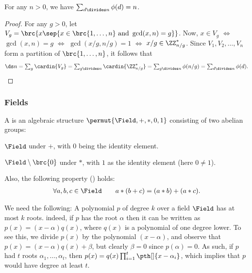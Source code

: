 \begin{lemma}
    For any $n > 0$, we have $\sum_{d \divides n} \phi(d) =n$.
\end{lemma}
\begin{proof}
    For any $g > 0$, let $V_g = \brc{ x \sep{ x \in \brc{1, \ldots, n}
          \text{ and } \gcd(x, n) = g}}$. Now, $x \in V_g$ $\iff$
    $\gcd(x,n) = g$ $\iff$ $\gcd(x/g, n/g) = 1$ $\iff$ $x/g \in
    \ZZ_{n/g}^*$. Since $V_1, V_2, \ldots, V_n$ form a partition of
    $\brc{1,\ldots, n}$, it follows that
    \begin{math}
        \ds \Biggl. n%
        =%
        \sum_g \cardin{V_g}%
        =%
        \sum_{g \divides n} \cardin{\ZZ_{n/g}^*}%
        =%
        \sum_{g \divides n} \phi(n/g)%
        =%
        \sum_{d \divides n} \phi(d).
    \end{math}
\end{proof}




\subsubsection{Fields}

\begin{defn}
    A  is an algebraic structure $\permut{\Field, +, *,
       0, 1}$ consisting of two abelian groups:
    \begin{compactenumA}
        \item $\Field$ under $+$, with $0$ being the identity element.
        
        \item $\Field \setminus \brc{0}$ under $*$, with $1$ as the
        identity element (here $0 \neq 1$).
    \end{compactenumA}
    Also, the following property () holds:
    \begin{align*}
        \forall a,b,c \in \Field \qquad a * (b + c) = (a*b) + (a*c).
    \end{align*}
\end{defn}

We need the following: A polynomial $p$ of degree $k$ over a field
$\Field$ has at most $k$ roots. indeed, if $p$ has the root $\alpha$
then it can be written as $p(x) = (x-\alpha) q(x)$, where $q(x)$ is a
polynomial of one degree lower. To see this, we divide $p(x)$ by the
polynomial $(x-\alpha)$, and observe that $p(x) = (x-\alpha) q(x) +
\beta$, but clearly $\beta = 0$ since $p(\alpha) = 0$. As such, if $p$
had $t$ roots $\alpha_1,\ldots, \alpha_t$, then $p(x) = q(x)
\prod_{i=1}^t \pth[]{x-\alpha_i}$, which implies that $p$ would have
degree at least $t$.




